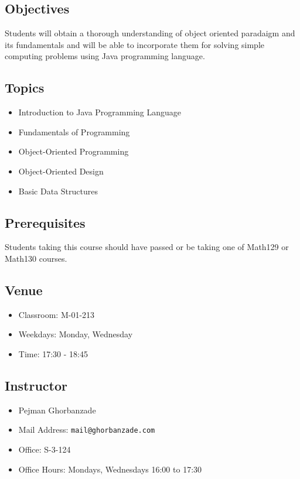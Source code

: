 \documentclass[12pt,letterpaper,twoside]{article}
\begin{document}


\subsection*{Objectives}
Students will obtain a thorough understanding of object oriented paradaigm and its fundamentals and will be able to incorporate them for solving simple computing problems using Java programming language.

\subsection*{Topics}
\begin{itemize}
\item[] Introduction to Java Programming Language
\item[] Fundamentals of Programming
\item[] Object-Oriented Programming
\item[] Object-Oriented Design
\item[] Basic Data Structures
\end{itemize}

\subsection*{Prerequisites}
Students taking this course should have passed or be taking one of Math129 or Math130 courses.

\subsection*{Venue}
\begin{itemize}
\item[] Classroom: M-01-213
\item[] Weekdays: Monday, Wednesday
\item[] Time: 17:30 - 18:45
\end{itemize}

\subsection*{Instructor}
\begin{itemize}
\item[] Pejman Ghorbanzade
\item[] Mail Address: \texttt{mail@ghorbanzade.com}
\item[] Office: S-3-124
\item[] Office Hours: Mondays, Wednesdays 16:00 to 17:30
\end{itemize}
\end{document}
